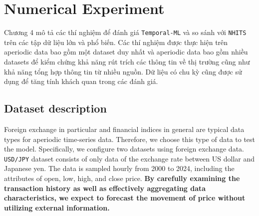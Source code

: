 
\chapter{Numerical Experiment}
\label{chap:experiment}

Chương 4 mô tả các thí nghiệm để đánh giá \verb|Temporal-ML| và so sánh với \verb|NHITS| trên các tập dữ liệu lớn và phổ biến. Các thí nghiệm được thực hiện trên aperiodic data bao gồm một dataset duy nhất và aperiodic data bao gồm nhiều datasets để kiểm chứng khả năng rút trích các thông tin về thị trường cũng như khả năng tổng hợp thông tin từ nhiều nguồn. Dữ liệu có chu kỳ cũng được sử dụng để tăng tính khách quan trong các đánh giá.


\section{Dataset description}


Foreign exchange in particular and financial indices in general are typical data types for aperiodic time-series data. Therefore, we choose this type of data to test the model. Specifically, we configure two datasets using foreign exchange data. \verb|USD/JPY| dataset consists of only data of the exchange rate between US dollar and Japanese yen. The data is sampled hourly from 2000 to 2024, including the attributes of open, low, high, and close price. \textbf{By carefully examining the transaction history as well as effectively aggregating data characteristics, we expect to forecast the movement of price without utilizing external information.}

